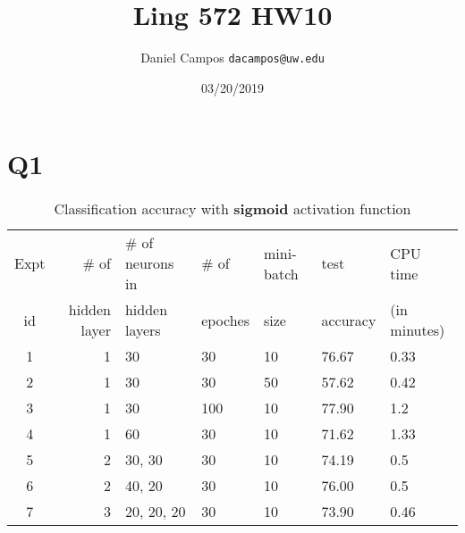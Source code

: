 \documentclass[11pt]{article}
\begin{document}
\title{Ling 572 HW10}
\author{Daniel Campos  \tt {dacampos@uw.edu}}
\date{03/20/2019}
\maketitle 
\section{Q1}         
\begin{table}[h]
\centering
\caption{Classification accuracy with {\bf sigmoid} activation function}
\label{table1}
  \begin{tabular}{|c|r|l|l|l|l|l|} \hline
    Expt & \# of          & \# of neurons in & \# of    & mini-batch & test  & CPU time   \\  
    id   &  hidden layer  & hidden layers    & epoches & size       & accuracy  & (in minutes) \\ \hline

    1   &  1              &  30              &  30     &  10       & 76.67     & 0.33 \\ \hline
    2   &  1              &  30              &  30     &  50       &  57.62   & 0.42 \\ \hline
    3   &  1              &  30              &  100    &  10       &  77.90   & 1.2 \\ \hline
    4   &  1              &  60              &  30     &  10       &   71.62  & 1.33\\ \hline
    5   &  2              &  30, 30          &  30     &  10       &  74.19   & 0.5 \\ \hline

    6   &  2              &  40, 20          &  30     &  10       &  76.00   & 0.5\\ \hline
    
    7   &  3              &  20, 20, 20      &  30     &  10       & 73.90    & 0.46 \\ \hline
  \end{tabular}
\end{table}
\end{document}
